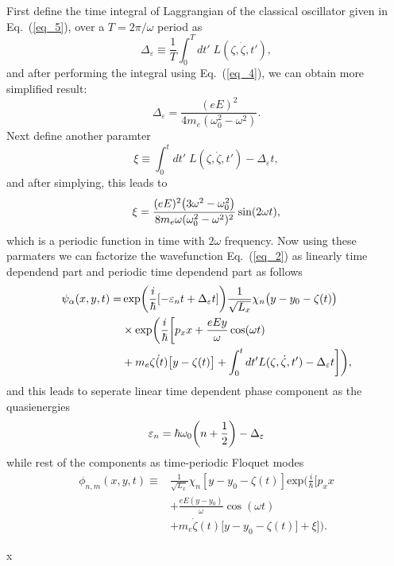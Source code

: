 First define the time integral of Laggrangian of the classical oscillator given in Eq.~(\ref{eq_5}), over a $T=2\pi/\omega$ period as
\begin{equation} \label{eq_b1}
  \Delta_{\varepsilon} \equiv \frac{1}{T} \int_0^T dt' \; L(\zeta,\dot{\zeta},t'),
\end{equation}
and after performing the integral using Eq.~(\ref{eq_4}), we can obtain more simplified result:
\begin{equation} \label{eq_b2}
  \Delta_{\varepsilon} = \frac{(eE)^2}{4m_e(\omega_0^2 - \omega^2)}.
\end{equation}
Next define another paramter
\begin{equation} \label{eq_b3}
  \xi \equiv
  \int_0^t dt' \; L(\zeta,\dot{\zeta},t') -
  \Delta_{\varepsilon} t,
\end{equation}
and after simplying, this leads to
\begin{equation} \label{eq_b4}
  \xi =
  \frac{(eE)^2\qty(3\omega^2 - \omega_0^2)}{8m_e\omega(\omega_0^2 - \omega^2)^2} \sin(2\omega t),
\end{equation}
which is a periodic function in time with $2\omega$ frequency. Now using these  parmaters we can factorize the wavefunction Eq.~(\ref{eq_2}) as linearly time dependend part and periodic time dependend part as follows
\begin{equation} \label{eq_b5}
  \begin{aligned}
    \psi_{\alpha}(x,y,t)  = &
    \exp(\frac{i}{\hbar}\qty[-\varepsilon_nt + \Delta_{\varepsilon} t ])
    \frac{1}{\sqrt{L_x}} \chi_n\big(y - y_0 - \zeta(t)\big)
    \\
    & \times
    \text{exp}\bigg(
     \frac{i}{\hbar}\bigg[
     p_x x +
     \frac{eEy}{\omega}\cos(\omega t) \\
     & +
     m_e\dot{\zeta(t)}\big[y-\zeta(t)\big]
     + \int_0^{t}dt'L(\zeta,\dot{\zeta},t') - \Delta_{\varepsilon} t  \bigg]
     \bigg),
  \end{aligned}
\end{equation}
and this leads to seperate linear time dependent phase component as the quasienergies
\begin{equation} \label{eq_b6}
  \varepsilon_{n} =
  \hbar \omega_0\qty(n + \frac{1}{2}) - \Delta_{\varepsilon}
\end{equation}
while rest of the components as time-periodic Floquet modes
\begin{equation} \label{eq_b7}
  \begin{aligned}
    \phi_{n,m}(x,y,t) \equiv &
    \frac{1}{\sqrt{L_x}} \chi_{n}\left[y - y_0 - \zeta(t)\right]
    \text{exp}\bigg(
     \frac{i}{\hbar}\bigg[
     p_x x \\
     & +
     \frac{eE(y - y_0)}{\omega}\cos(\omega t) \\
     & +
     m_e\dot{\zeta}(t)\big[y - y_0 -\zeta(t)\big]
     + \xi \bigg]\bigg).
  \end{aligned}
\end{equation}














x
